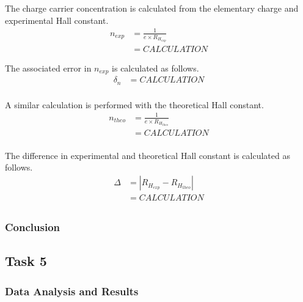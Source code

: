 \documentclass[a4paper]{article}
\begin{document}



The charge carrier concentration is calculated from the elementary charge and experimental Hall constant.
\begin{align*}
n_{exp} &= \frac{1}{e \times R_{H_{exp}}} \\
	&= CALCULATION 
\end{align*}

The associated error in $n_{exp}$ is calculated as follows.
\begin{align*}
\delta_n &= CALCULATION \\
\end{align*}

A similar calculation is performed with the theoretical Hall constant.
\begin{align*}
n_{theo} &= \frac{1}{e \times R_{H_{theo}}} \\
	&= CALCULATION \\
\end{align*}

The difference in experimental and theoretical Hall constant is calculated as follows.
\begin{align*}
\Delta &= | R_{H_{exp}} - R_{H_{theo}} | \\
	   &= CALCULATION \\
\end{align*}


\subsubsection{Conclusion}

\subsection{Task 5}

\subsubsection{Data Analysis and Results}
\end{document}

